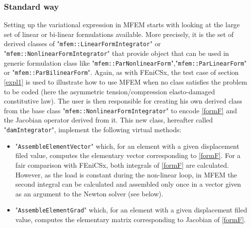 \documentclass[12pt]{article}
\newcommand{\f}[1]{FEniCSx#1}
\newcommand{\mycode}[1]{\textsf{"}\lstinline`#1`\textsf{"}}
\begin{document}
\subsubsection{Standard way\label{mfem_std}}
Setting up the variational expression in MFEM starts with looking at the large set of linear or bi-linear formulations available.
More precisely, it is the set of derived classes of \mycode{mfem::LinearFormIntegrator} or \linebreak \mycode{mfem::NonlinearFormIntegrator} that provide object that can be used in generic formulation class like \mycode{mfem::ParNonlinearForm},\mycode{mfem::ParLinearForm} or \mycode{mfem::ParBilinearForm}. Again, as with \f{}, the test case of section \ref{expl1} is used to illustrate how to use MFEM when no class satisfies the problem to be coded (here the asymmetric tension/compression elasto-damaged constitutive law). The user is then responsible for creating his own derived class from the base class \mycode{mfem::NonlinearFormIntegrator} to encode \eqref{formF} and the Jacobian operator derived from it. 
This new class, hereafter called \mycode{damIntegrator},  implement the following virtual methods:
\begin{itemize}
	\item \mycode{AssembleElementVector} which, for an element with a given displacement filed value, computes the elementary vector corresponding to \eqref{formF}.  For a fair comparison with \f{}, both integrals of \eqref{formF} are calculated.
	 However, as the load is constant during the non-linear loop, in MFEM the second integral can be calculated and assembled only once in a vector given as an argument to the Newton solver (see below).
	\item \mycode{AssembleElementGrad} which, for an element with a given displacement filed value, computes the elementary matrix corresponding to Jacobian of \eqref{formF}.
\end{itemize}	
\end{document}
